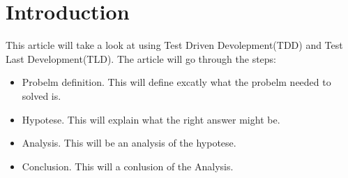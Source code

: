 \section{Introduction}
This article will take a look at using Test Driven Devolepment(TDD) and Test Last Development(TLD).
The article will go through the steps:
\begin{itemize}
\item Probelm definition.
This will define excatly what the probelm needed to solved is.
\item Hypotese. 
This will explain what the right answer might be. 
\item Analysis.
This will be an analysis of the hypotese.
\item Conclusion.
This will a conlusion of the Analysis.
\end{itemize}